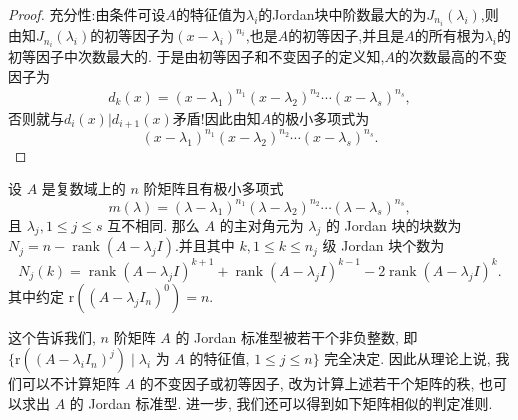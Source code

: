 \documentclass[../../main.tex]{subfiles}
\begin{document}
\begin{proof}
{\heiti 充分性:}由条件可设$A$的特征值为$\lambda_i$的Jordan块中阶数最大的为$J_{n_i}(\lambda_i)$,则由知$J_{n_i}(\lambda_i)$的初等因子为$(x-\lambda_i)^{n_i}$,也是$A$的初等因子,并且是$A$的所有根为$\lambda_i$的初等因子中次数最大的.
于是由初等因子和不变因子的定义知,$A$的次数最高的不变因子为
\begin{align*}
d_k(x)=(x-\lambda_1)^{n_1}(x-\lambda_2)^{n_2}\cdots(x-\lambda_s)^{n_s},
\end{align*}
否则就与$d_i(x)|d_{i+1}(x)$矛盾!因此由知$A$的极小多项式为
$$(x-\lambda_1)^{n_1}(x-\lambda_2)^{n_2}\cdots(x-\lambda_s)^{n_s}.$$
\end{proof}


\begin{theorem}[Jordan标准型的计算]\label{theorem:Jordan块的个数与秩的关系}
设 \( A \) 是复数域上的 \( n \) 阶矩阵且有极小多项式  
\[ m(\lambda) = (\lambda - \lambda_1)^{n_1} (\lambda - \lambda_2)^{n_2} \cdots (\lambda - \lambda_s)^{n_s}, \]  
且 \( \lambda_j, 1 \leqslant j \leqslant s \) 互不相同. 那么 \( A \) 的主对角元为 \( \lambda_j \) 的 Jordan 块的块数为 \( N_j = n - \operatorname{rank}(A - \lambda_j I) \).并且其中 \( k, 1 \leqslant k \leqslant n_j \) 级 Jordan 块个数为  
\[ N_j(k) = \operatorname{rank}(A - \lambda_j I)^{k+1} + \operatorname{rank}(A - \lambda_j I)^{k-1} - 2\operatorname{rank}(A - \lambda_j I)^k. \]
其中约定 $\mathrm{r}((A - \lambda_j I_n)^0) = n$.
\end{theorem}
\begin{remark}
这个告诉我们, $n$ 阶矩阵 $A$ 的 Jordan 标准型被若干个非负整数, 即 $\{\mathrm{r}((A - \lambda_i I_n)^j) \mid \lambda_i$ 为 $A$ 的特征值, $1 \leqslant  j \leqslant  n\}$ 完全决定. 因此从理论上说, 我们可以不计算矩阵 $A$ 的不变因子或初等因子, 改为计算上述若干个矩阵的秩, 也可以求出 $A$ 的 Jordan 标准型. 进一步, 我们还可以得到如下矩阵相似的判定准则.
\end{remark}
\end{document}
